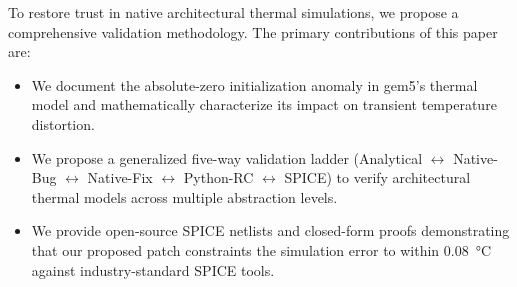 To restore trust in native architectural thermal simulations, we propose a comprehensive validation methodology. The primary contributions of this paper are:
\begin{itemize}
    \item We document the absolute-zero initialization anomaly in gem5's thermal model and mathematically characterize its impact on transient temperature distortion.
    \item We propose a generalized five-way validation ladder (Analytical $\leftrightarrow$ Native-Bug $\leftrightarrow$ Native-Fix $\leftrightarrow$ Python-RC $\leftrightarrow$ SPICE) to verify architectural thermal models across multiple abstraction levels.
    \item We provide open-source SPICE netlists and closed-form proofs demonstrating that our proposed patch constraints the simulation error to within \SI{0.08}{\degreeCelsius} against industry-standard SPICE tools.
\end{itemize}
